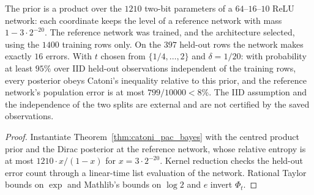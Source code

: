 \begin{lemma}\label{lem:pacbayes_mlp_certificate}
\leanok
{}
The prior is a product over the $1210$ two-bit parameters of a
$64$--$16$--$10$ ReLU network: each coordinate keeps the level of a reference
network with mass $1-3\cdot2^{-20}$. The reference network was trained, and the
architecture selected, using the $1400$ training rows only. On the $397$
held-out rows the network makes exactly $16$ errors. With $t$ chosen from
$\{1/4,\dots,2\}$ and $\delta=1/20$: with probability at least $95\%$ over IID
held-out observations independent of the training rows, every posterior obeys
Catoni's inequality relative to this prior, and the reference network's
population error is at most $799/10000<8\%$.
The IID assumption and the independence of the two splits are external and
are not certified by the saved observations.
\end{lemma}
\begin{proof}
\leanok
Instantiate Theorem~\ref{thm:catoni_pac_bayes} with the centred product prior
and the Dirac posterior at the reference network, whose relative entropy is at
most $1210\cdot x/(1-x)$ for $x=3\cdot2^{-20}$. Kernel reduction checks the
held-out error count through a linear-time list evaluation of the network.
Rational Taylor bounds on $\exp$ and Mathlib's bounds on $\log 2$ and $e$ invert
$\Phi_t$.
\end{proof}

